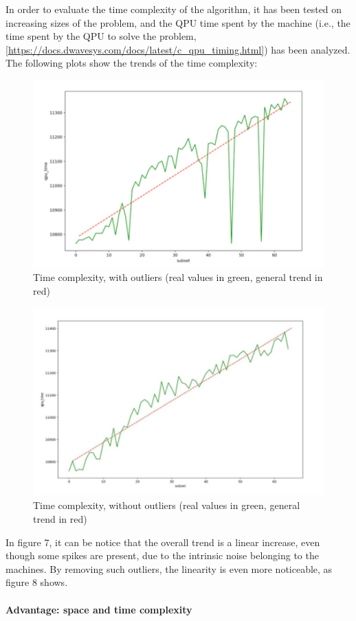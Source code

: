 \documentclass[oneside,a4paper]{article}
\begin{document}
In order to evaluate the time complexity of the algorithm, it has been tested on increasing sizes of the problem, and the QPU time spent by the machine (i.e., the time spent by the QPU to solve the problem, [\url{https://docs.dwavesys.com/docs/latest/c_qpu_timing.html]}) has been analyzed. The following plots show the trends of the time complexity:
\begin{figure}[htp]
\centering
\includegraphics[width=15cm]{LaTeXTemplate/Images/2000QfirstT1.png}
\caption{Time complexity, with outliers (real values in green, general trend in red)}
\end{figure}
\begin{figure}[htp]
\centering
\includegraphics[width=15cm]{LaTeXTemplate/Images/2000QfirstT2.png}
\caption{Time complexity, without outliers (real values in green, general trend in red)}
\end{figure}

In figure 7, it can be notice that the overall trend is a linear increase, even though some spikes are present, due to the intrinsic noise belonging to the machines. By removing such outliers, the linearity is even more noticeable, as figure 8 shows.
\\
\\
\textbf{Advantage: space and time complexity} \\
\end{document}
